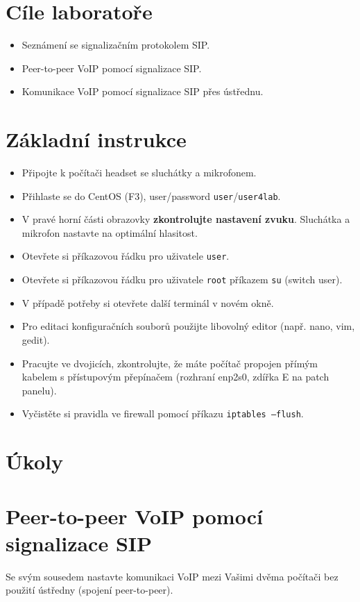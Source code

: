 
\section*{Cíle laboratoře}
\begin{itemize}
  \item Seznámení se signalizačním protokolem SIP.
  \item Peer-to-peer VoIP pomocí signalizace SIP.
  \item Komunikace VoIP pomocí signalizace SIP přes ústřednu.
\end{itemize}

\section*{Základní instrukce}
\begin{itemize}
  \item Připojte k počítači headset se sluchátky a mikrofonem.
  \item Přihlaste se do CentOS (F3), user/password {\tt user}/{\tt user4lab}.
  \item V pravé horní části obrazovky {\bf zkontrolujte nastavení zvuku}. Sluchátka a mikrofon nastavte na optimální hlasitost.
  \item Otevřete si příkazovou řádku pro uživatele {\tt user}.
  \item Otevřete si příkazovou řádku pro uživatele {\tt root} příkazem {\tt su} (switch user).
  \item V případě potřeby si otevřete další terminál v novém okně.
  \item Pro editaci konfiguračních souborů použijte libovolný editor (např. nano, vim, gedit).
  \item Pracujte ve dvojicích, zkontrolujte, že máte počítač propojen
    přímým kabelem s přístupovým přepínačem (rozhraní enp2s0, zdířka E na patch panelu).
  \item Vyčistěte si pravidla ve firewall pomocí příkazu {\tt iptables --flush}.
\end{itemize}

\section*{Úkoly}
\section{Peer-to-peer VoIP pomocí signalizace SIP}
Se svým sousedem nastavte komunikaci VoIP mezi Vašimi dvěma počítači bez použití ústředny (spojení peer-to-peer).

